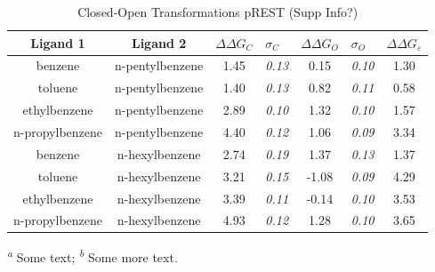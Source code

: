 \documentclass[T4paper.tex]{subfiles}
\begin{document}
\begin{table}[!htb]
\centering
\caption{Closed-Open Transformations pREST (Supp Info?)}
\label{tbl:C-O_pREST}
\begin{tabular}{|c|c|c|l|c|l|c|}
\hline
\textbf{Ligand 1}       & \textbf{Ligand 2}    & {\color[HTML]{800080} \boldmath$\Delta\Delta G_{C}$} & {\color[HTML]{800080} \boldmath$\sigma_{C}$} & {\color[HTML]{008000} \boldmath$\Delta\Delta G_{O}$} & {\color[HTML]{008000} \boldmath$\sigma_{O}$} & \boldmath$\Delta\Delta G_{\varepsilon}$\\ \hline
\cellcolor[HTML]{800080}benzene         & \cellcolor[HTML]{008000}n-pentylbenzene & 1.45                                   & \textit{0.13}                       & 0.15                                & \textit{0.10}                       & \cellcolor[HTML]{FFCCC9}1.30 \\ \hline
\cellcolor[HTML]{800080}toluene         & \cellcolor[HTML]{008000}n-pentylbenzene & 1.40                                   & \textit{0.13}                       & 0.82                                 & \textit{0.11}                       & \cellcolor[HTML]{9AFF99}0.58 \\ \hline
\cellcolor[HTML]{800080}ethylbenzene    & \cellcolor[HTML]{008000}n-pentylbenzene & 2.89                                   & \textit{0.10}                       & 1.32                                 & \textit{0.10}                       & \cellcolor[HTML]{FFCCC9}1.57 \\ \hline
\cellcolor[HTML]{800080}n-propylbenzene & \cellcolor[HTML]{008000}n-pentylbenzene & 4.40                                   & \textit{0.12}                       & 1.06                                & \textit{0.09}                       & \cellcolor[HTML]{FFCCC9}3.34 \\ \hline
\cellcolor[HTML]{800080}benzene         & \cellcolor[HTML]{008000}n-hexylbenzene  & 2.74                                   & \textit{0.19}                       & 1.37                                & \textit{0.13}                       & \cellcolor[HTML]{FFCCC9}1.37 \\ \hline
\cellcolor[HTML]{800080}toluene         & \cellcolor[HTML]{008000}n-hexylbenzene  & 3.21                                   & \textit{0.15}                       & -1.08                                & \textit{0.09}                       & \cellcolor[HTML]{FFCCC9}4.29 \\ \hline
\cellcolor[HTML]{800080}ethylbenzene    & \cellcolor[HTML]{008000}n-hexylbenzene  & 3.39                                   & \textit{0.11}                       & -0.14                                & \textit{0.10}                       & \cellcolor[HTML]{FFCCC9}3.53 \\ \hline
\cellcolor[HTML]{800080}n-propylbenzene & \cellcolor[HTML]{008000}n-hexylbenzene  & 4.93                                   & \textit{0.12}                       & 1.28                                 & \textit{0.10}                       & \cellcolor[HTML]{FFCCC9}3.65 \\ \hline
\end{tabular}

  \textsuperscript{\emph{a}} Some text;
  \textsuperscript{\emph{b}} Some more text.
\end{table}
\end{document}
